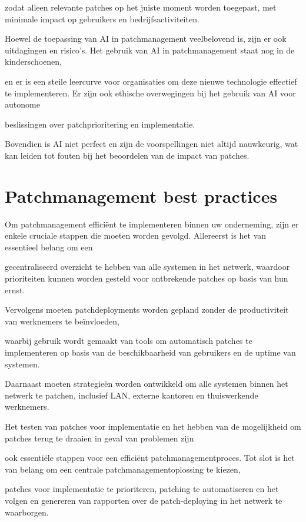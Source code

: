 zodat alleen relevante patches op het juiste moment worden toegepast, met minimale impact op gebruikers en bedrijfsactiviteiten.

Hoewel de toepassing van AI in patchmanagement veelbelovend is, zijn er ook uitdagingen en risico's. Het gebruik van AI in patchmanagement staat nog in de kinderschoenen, 

en er is een steile leercurve voor organisaties om deze nieuwe technologie effectief te implementeren. Er zijn ook ethische overwegingen bij het gebruik van AI voor autonome 

beslissingen over patchprioritering en implementatie. 

Bovendien is AI niet perfect en zijn de voorspellingen niet altijd nauwkeurig, wat kan leiden tot fouten bij het beoordelen van de impact van patches. \autocite{OFlaherty2023}

\section{Patchmanagement best practices}
Om patchmanagement efficiënt te implementeren binnen uw onderneming, zijn er enkele cruciale stappen die moeten worden gevolgd. Allereerst is het van essentieel belang om een 

gecentraliseerd overzicht te hebben van alle systemen in het netwerk, waardoor prioriteiten kunnen worden gesteld voor ontbrekende patches op basis van hun ernst. 

Vervolgens moeten patchdeployments worden gepland zonder de productiviteit van werknemers te beïnvloeden, 

waarbij gebruik wordt gemaakt van tools om automatisch patches te implementeren op basis van de beschikbaarheid van gebruikers en de uptime van systemen.

Daarnaast moeten strategieën worden ontwikkeld om alle systemen binnen het netwerk te patchen, inclusief LAN, externe kantoren en thuiswerkende werknemers. 

Het testen van patches voor implementatie en het hebben van de mogelijkheid om patches terug te draaien in geval van problemen zijn

ook essentiële stappen voor een efficiënt patchmanagementproces. Tot slot is het van belang om een centrale patchmanagementoplossing te kiezen,

patches voor implementatie te prioriteren, patching te automatiseren en het volgen en genereren van rapporten over de patch-deploying in het netwerk te waarborgen. \autocite{ManageEngine2024}


